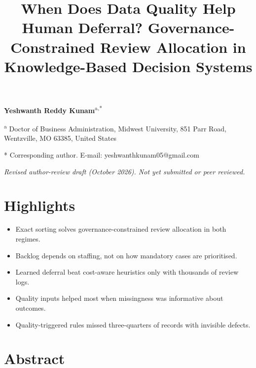 \documentclass[
  11pt,
]{article}
\title{When Does Data Quality Help Human Deferral?
Governance-Constrained Review Allocation in Knowledge-Based Decision
Systems}
\author{}
\date{}
\providecommand{\tightlist}{%
  \setlength{\itemsep}{0pt}\setlength{\parskip}{0pt}}
\begin{document}
\maketitle

\textbf{Yeshwanth Reddy Kunam}\textsuperscript{a,*}

\textsuperscript{a} Doctor of Business Administration, Midwest
University, 851 Parr Road, Wentzville, MO 63385, United States

* Corresponding author. E-mail: yeshwanthkunam05@gmail.com

\emph{Revised author-review draft (October 2026). Not yet submitted or
peer reviewed.}

\hypertarget{highlights}{%
\section*{Highlights}\label{highlights}}

\begin{itemize}
\tightlist
\item
  Exact sorting solves governance-constrained review allocation in both
  regimes.
\item
  Backlog depends on staffing, not on how mandatory cases are
  prioritised.
\item
  Learned deferral beat cost-aware heuristics only with thousands of
  review logs.
\item
  Quality inputs helped most when missingness was informative about
  outcomes.
\item
  Quality-triggered rules missed three-quarters of records with
  invisible defects.
\end{itemize}

\hypertarget{abstract}{%
\section*{Abstract}\label{abstract}}
\end{document}
